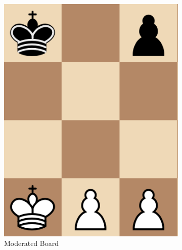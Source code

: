 \documentclass{article}
\begin{document}
\begin{figure}[h]
\begin{subfigure}{0.26\textwidth}
                \includegraphics[width=\linewidth]{moderate_board}
                \caption{Moderated Board}
        \end{subfigure}\quad
        \begin{subfigure}{0.26\textwidth}

\end{subfigure}
\end{figure}
\end{document}
